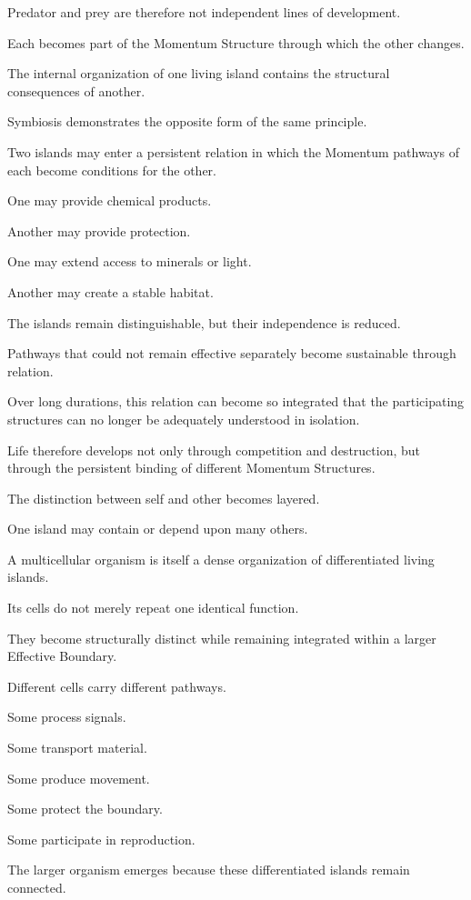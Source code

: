 Predator and prey are therefore not independent lines of development.

Each becomes part of the Momentum Structure through which the other changes.

The internal organization of one living island contains the structural consequences of another.

Symbiosis demonstrates the opposite form of the same principle.

Two islands may enter a persistent relation in which the Momentum pathways of each become conditions for the other.

One may provide chemical products.

Another may provide protection.

One may extend access to minerals or light.

Another may create a stable habitat.

The islands remain distinguishable, but their independence is reduced.

Pathways that could not remain effective separately become sustainable through relation.

Over long durations, this relation can become so integrated that the participating structures can no longer be adequately understood in isolation.

Life therefore develops not only through competition and destruction, but through the persistent binding of different Momentum Structures.

The distinction between self and other becomes layered.

One island may contain or depend upon many others.

A multicellular organism is itself a dense organization of differentiated living islands.

Its cells do not merely repeat one identical function.

They become structurally distinct while remaining integrated within a larger Effective Boundary.

Different cells carry different pathways.

Some process signals.

Some transport material.

Some produce movement.

Some protect the boundary.

Some participate in reproduction.

The larger organism emerges because these differentiated islands remain connected.

